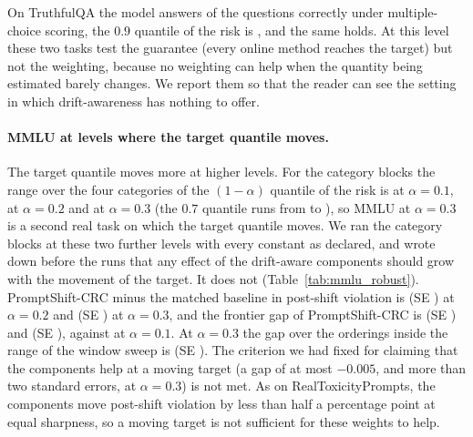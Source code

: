 On TruthfulQA the model answers \TqaAcc{} of the questions correctly under multiple-choice scoring, the $0.9$ quantile of the risk is \TqaQnine{}, and the same holds. At this level these two tasks test the guarantee (every online method reaches the target) but not the weighting, because no weighting can help when the quantity being estimated barely changes. We report them so that the reader can see the setting in which drift-awareness has nothing to offer.

\paragraph{MMLU at levels where the target quantile moves.}
The target quantile moves more at higher levels. For the category blocks the range over the four categories of the $(1-\alpha)$ quantile of the risk is \MmluSpreadAOne{} at $\alpha=0.1$, \MmluSpreadATwo{} at $\alpha=0.2$ and \MmluSpreadAThree{} at $\alpha=0.3$ (the $0.7$ quantile runs from \MmluSevenLo{} to \MmluSevenHi{}), so MMLU at $\alpha=0.3$ is a second real task on which the target quantile moves. We ran the category blocks at these two further levels with every constant as declared, and wrote down before the runs that any effect of the drift-aware components should grow with the movement of the target. It does not (Table~\ref{tab:mmlu_robust}). PromptShift-CRC minus the matched baseline in post-shift violation is \MmluATwoPSvsMatchedPost{} (SE \MmluATwoPSvsMatchedPostSE{}) at $\alpha=0.2$ and \MmluAThreePSvsMatchedPost{} (SE \MmluAThreePSvsMatchedPostSE{}) at $\alpha=0.3$, and the frontier gap of PromptShift-CRC is \MmluATwoFrontierPS{} (SE \MmluATwoFrontierPSSE{}) and \MmluAThreeFrontierPS{} (SE \MmluAThreeFrontierPSSE{}), against \MmluCatFrontierPS{} at $\alpha=0.1$. At $\alpha=0.3$ the gap over the \MmluAThreeFrontierPSInN{} orderings inside the range of the window sweep is \MmluAThreeFrontierPSIn{} (SE \MmluAThreeFrontierPSInSE{}). The criterion we had fixed for claiming that the components help at a moving target (a gap of at most $-0.005$, and more than two standard errors, at $\alpha=0.3$) is not met. As on RealToxicityPrompts, the components move post-shift violation by less than half a percentage point at equal sharpness, so a moving target is not sufficient for these weights to help.

